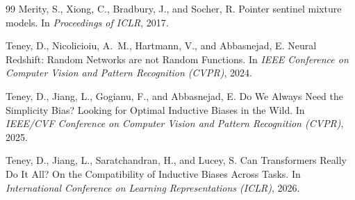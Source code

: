 \documentclass[11pt]{article}
\begin{document}
\begin{thebibliography}{99}
Merity, S., Xiong, C., Bradbury, J., and Socher, R.
\newblock Pointer sentinel mixture models.
\newblock In \textit{Proceedings of ICLR}, 2017.

Teney, D., Nicolicioiu, A.~M., Hartmann, V., and Abbasnejad, E.
\newblock Neural Redshift: Random Networks are not Random Functions.
\newblock In \textit{IEEE Conference on Computer Vision and Pattern Recognition (CVPR)}, 2024.

Teney, D., Jiang, L., Gogianu, F., and Abbasnejad, E.
\newblock Do We Always Need the Simplicity Bias? Looking for Optimal Inductive Biases in the Wild.
\newblock In \textit{IEEE/CVF Conference on Computer Vision and Pattern Recognition (CVPR)}, 2025.

Teney, D., Jiang, L., Saratchandran, H., and Lucey, S.
\newblock Can Transformers Really Do It All? On the Compatibility of Inductive Biases Across Tasks.
\newblock In \textit{International Conference on Learning Representations (ICLR)}, 2026.

\end{thebibliography}
\end{document}
